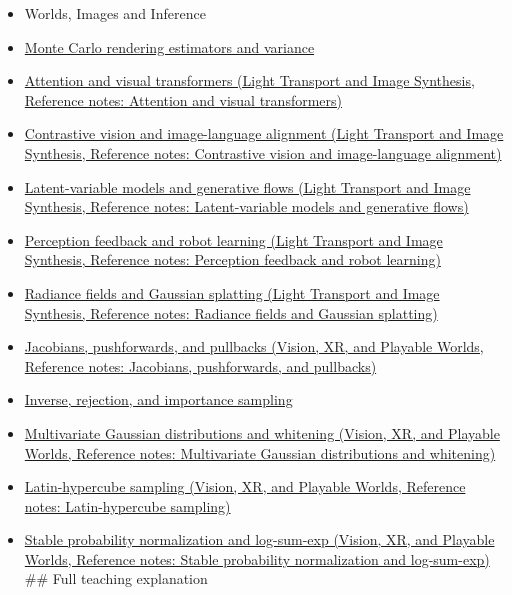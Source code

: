\begin{itemize}
\item
  {Worlds, Images and Inference}
\item
  \hyperref[appendix-031e02bf28af]{Monte Carlo rendering estimators and variance}
\item
  \href{../04-Light-Transport-and-Image-Synthesis/main.pdf\#nameddest=appendix-a9d5dfdd164a}{Attention and visual transformers (Light Transport and Image Synthesis, Reference notes: Attention and visual transformers)}
\item
  \href{../04-Light-Transport-and-Image-Synthesis/main.pdf\#nameddest=appendix-772f1fd96148}{Contrastive vision and image-language alignment (Light Transport and Image Synthesis, Reference notes: Contrastive vision and image-language alignment)}
\item
  \href{../04-Light-Transport-and-Image-Synthesis/main.pdf\#nameddest=appendix-2c568f05ee34}{Latent-variable models and generative flows (Light Transport and Image Synthesis, Reference notes: Latent-variable models and generative flows)}
\item
  \href{../04-Light-Transport-and-Image-Synthesis/main.pdf\#nameddest=appendix-b0c42da325f1}{Perception feedback and robot learning (Light Transport and Image Synthesis, Reference notes: Perception feedback and robot learning)}
\item
  \href{../04-Light-Transport-and-Image-Synthesis/main.pdf\#nameddest=appendix-c5b332e400e7}{Radiance fields and Gaussian splatting (Light Transport and Image Synthesis, Reference notes: Radiance fields and Gaussian splatting)}
\item
  \href{../07-Vision-XR-and-Playable-Worlds/main.pdf\#nameddest=appendix-d8a7ddb675eb}{Jacobians, pushforwards, and pullbacks (Vision, XR, and Playable Worlds, Reference notes: Jacobians, pushforwards, and pullbacks)}
\item
  \hyperref[appendix-8d863ed954d0]{Inverse, rejection, and importance sampling}
\item
  \href{../07-Vision-XR-and-Playable-Worlds/main.pdf\#nameddest=appendix-12bbe185dbe5}{Multivariate Gaussian distributions and whitening (Vision, XR, and Playable Worlds, Reference notes: Multivariate Gaussian distributions and whitening)}
\item
  \href{../07-Vision-XR-and-Playable-Worlds/main.pdf\#nameddest=appendix-1c5e85693a06}{Latin-hypercube sampling (Vision, XR, and Playable Worlds, Reference notes: Latin-hypercube sampling)}
\item
  \href{../07-Vision-XR-and-Playable-Worlds/main.pdf\#nameddest=appendix-d580b422240f}{Stable probability normalization and log-sum-exp (Vision, XR, and Playable Worlds, Reference notes: Stable probability normalization and log-sum-exp)} \#\# Full teaching explanation
\end{itemize}

